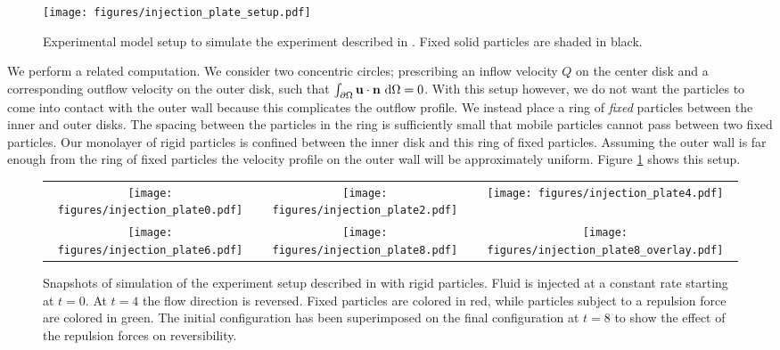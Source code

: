 \documentclass[preprint, 10pt]{elsarticle}
\begin{document}
\begin{figure}[h!]
\begin{center}
\texttt{[image: figures/injection\_plate\_setup.pdf]}
\end{center}
\caption{Experimental model setup to simulate the experiment described in
\cite{MacMinn2015}. Fixed solid particles are shaded in
black.}\label{fig:radial}
\end{figure}

We perform a related computation. We consider two concentric circles; prescribing an inflow velocity $Q$ on the
center disk and a corresponding outflow velocity on the outer disk, such that
$\int_{\partial\Omega} {\mathbf{u}}\cdot{\mathbf{n}}~\text{d}\Omega = 0$. With this setup however, we do not want the particles
to come into contact with the outer wall because this
complicates the outflow profile. We instead place a ring of
\textit{fixed} particles between the inner and outer disks. The
spacing between the particles in the ring is sufficiently small that mobile
particles cannot pass between two fixed particles. Our monolayer of rigid particles
is confined between the inner disk and this ring of fixed particles.
Assuming the outer wall is far enough  from the ring of fixed particles the
velocity profile on the outer wall will be approximately uniform. Figure \ref{fig:radial}
shows this setup.

\begin{figure}[h!]
\begin{tabular}{c c c}
\texttt{[image: figures/injection\_plate0.pdf]}&
\texttt{[image: figures/injection\_plate2.pdf]}&
\texttt{[image: figures/injection\_plate4.pdf]}\\
\texttt{[image: figures/injection\_plate6.pdf]}&
\texttt{[image: figures/injection\_plate8.pdf]}&
\texttt{[image: figures/injection\_plate8\_overlay.pdf]}\\
\end{tabular}
\caption{Snapshots of simulation of the experiment setup described in \cite{MacMinn2015} with rigid
particles. Fluid is injected at a constant rate
starting at $t=0$. At $t=4$ the flow direction is reversed. Fixed particles are
colored in red, while particles subject to a repulsion force are colored in
green. The initial configuration has been superimposed on the final configuration at $t=8$ to show the effect of the repulsion forces on reversibility.}
\label{fig:macminn}
\end{figure}
\end{document}
